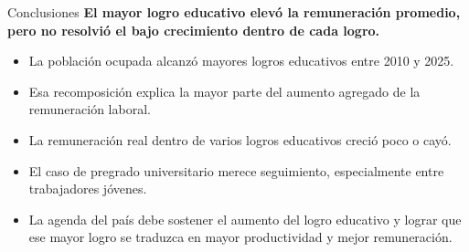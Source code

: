 \documentclass[aspectratio=169,11pt]{beamer}
\newcommand{\idea}[1]{{\large\textbf{\color{cjcblue}#1}}\par\vspace{0.18cm}}
\begin{document}
\begin{frame}{Conclusiones}
\idea{El mayor logro educativo elevó la remuneración promedio, pero no resolvió el bajo crecimiento dentro de cada logro.}

\begin{itemize}
  \item La población ocupada alcanzó mayores logros educativos entre 2010 y 2025.
  \item Esa recomposición explica la mayor parte del aumento agregado de la remuneración laboral.
  \item La remuneración real dentro de varios logros educativos creció poco o cayó.
  \item El caso de pregrado universitario merece seguimiento, especialmente entre trabajadores jóvenes.
  \item La agenda del país debe sostener el aumento del logro educativo y lograr que ese mayor logro se traduzca en mayor productividad y mejor remuneración.
\end{itemize}

\end{frame}
\end{document}
